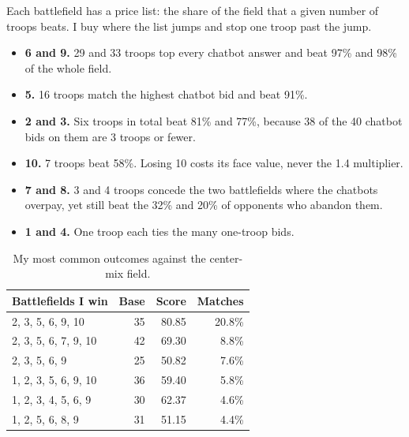 \documentclass[10pt,a4paper,twocolumn]{article}
\begin{document}
Each battlefield has a price list: the share of the field that a given number of troops beats.
I buy where the list jumps and stop one troop past the jump.
\begin{itemize}
  \item \textbf{6 and 9.} 29 and 33 troops top every chatbot answer and beat 97\% and 98\% of the whole field.
  \item \textbf{5.} 16 troops match the highest chatbot bid and beat 91\%.
  \item \textbf{2 and 3.} Six troops in total beat 81\% and 77\%, because 38 of the 40 chatbot bids on them are 3 troops or fewer.
  \item \textbf{10.} 7 troops beat 58\%.
  Losing 10 costs its face value, never the 1.4 multiplier.
  \item \textbf{7 and 8.} 3 and 4 troops concede the two battlefields where the chatbots overpay, yet still beat the 32\% and 20\% of opponents who abandon them.
  \item \textbf{1 and 4.} One troop each ties the many one-troop bids.
\end{itemize}

\begin{table}[t]
\centering\small
\caption{My most common outcomes against the center-mix field.}
\label{tab:outcomes}
\begin{tabular}{@{}lrrr@{}}
\toprule
Battlefields I win & Base & Score & Matches \\
\midrule
2, 3, 5, 6, 9, 10 & 35 & 80.85 & 20.8\% \\
2, 3, 5, 6, 7, 9, 10 & 42 & 69.30 & 8.8\% \\
2, 3, 5, 6, 9 & 25 & 50.82 & 7.6\% \\
1, 2, 3, 5, 6, 9, 10 & 36 & 59.40 & 5.8\% \\
1, 2, 3, 4, 5, 6, 9 & 30 & 62.37 & 4.6\% \\
1, 2, 5, 6, 8, 9 & 31 & 51.15 & 4.4\% \\
\bottomrule
\end{tabular}
\end{table}
\end{document}
